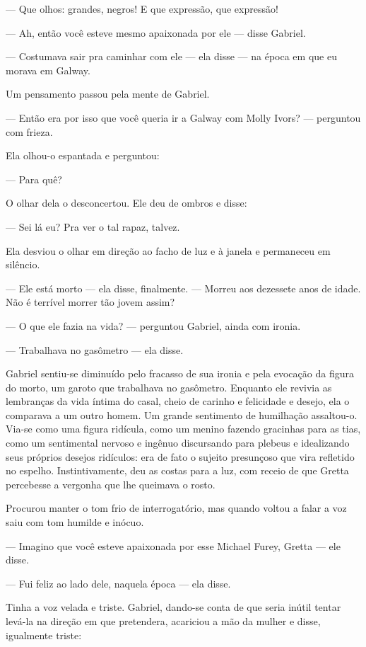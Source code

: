 --- Que olhos: grandes, negros! E que expressão, que expressão!

--- Ah, então você esteve mesmo apaixonada por ele --- disse Gabriel.

--- Costumava sair pra caminhar com ele --- ela disse --- na época em
que eu morava em Galway.

Um pensamento passou pela mente de Gabriel.

--- Então era por isso que você queria ir a Galway com Molly Ivors?
--- perguntou com frieza.

Ela olhou-o espantada e perguntou:

--- Para quê?

O olhar dela o desconcertou. Ele deu de ombros e disse:

--- Sei lá eu? Pra ver o tal rapaz, talvez.

Ela desviou o olhar em direção ao facho de luz e à janela e permaneceu
em silêncio.

--- Ele está morto --- ela disse, finalmente. --- Morreu aos dezessete
anos de idade. Não é terrível morrer tão jovem assim?

--- O que ele fazia na vida? --- perguntou Gabriel, ainda com ironia.

--- Trabalhava no gasômetro --- ela disse.

Gabriel sentiu-se diminuído pelo fracasso de sua ironia e pela
evocação da figura do morto, um garoto que trabalhava no gasômetro.
Enquanto ele revivia as lembranças da vida íntima do casal, cheio de
carinho e felicidade e desejo, ela o comparava a um outro homem. Um
grande sentimento de humilhação assaltou-o. Via-se como uma figura
ridícula, como um menino fazendo gracinhas para as tias, como um
sentimental nervoso e ingênuo discursando para plebeus e idealizando
seus próprios desejos ridículos: era de fato o sujeito presunçoso que
vira refletido no espelho.  Instintivamente, deu as costas para a luz,
com receio de que Gretta percebesse a vergonha que lhe queimava o
rosto.

Procurou manter o tom frio de interrogatório, mas quando voltou a
falar a voz saiu com tom humilde e inócuo.

--- Imagino que você esteve apaixonada por esse Michael Furey, Gretta
--- ele disse.

--- Fui feliz ao lado dele, naquela época --- ela disse.

Tinha a voz velada e triste. Gabriel, dando-se conta de que seria
inútil tentar levá-la na direção em que pretendera, acariciou a mão da
mulher e disse, igualmente triste:

